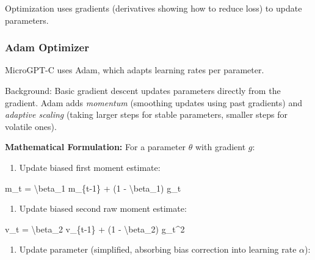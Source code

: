 \documentclass[
]{article}
\newenvironment{Shaded}{}{}
\newcommand{\NormalTok}[1]{#1}
\providecommand{\tightlist}{%
  \setlength{\itemsep}{0pt}\setlength{\parskip}{0pt}}
\begin{document}
Optimization uses gradients (derivatives showing how to reduce loss) to
update parameters.

\subsubsection{Adam Optimizer}\label{adam-optimizer}

MicroGPT-C uses Adam, which adapts learning rates per parameter.

Background: Basic gradient descent updates parameters directly from the
gradient. Adam adds \emph{momentum} (smoothing updates using past
gradients) and \emph{adaptive scaling} (taking larger steps for stable
parameters, smaller steps for volatile ones).

\textbf{Mathematical Formulation:} For a parameter \(\theta\) with
gradient \(g\):

\begin{enumerate}
\def\labelenumi{\arabic{enumi}.}
\tightlist
\item
  Update biased first moment estimate:
\end{enumerate}

\begin{Shaded}
\begin{Highlighting}[]
\NormalTok{   m\_t = \textbackslash{}beta\_1 m\_\{t{-}1\} + (1 {-} \textbackslash{}beta\_1) g\_t}
\end{Highlighting}
\end{Shaded}

\begin{enumerate}
\def\labelenumi{\arabic{enumi}.}
\setcounter{enumi}{1}
\tightlist
\item
  Update biased second raw moment estimate:
\end{enumerate}

\begin{Shaded}
\begin{Highlighting}[]
\NormalTok{   v\_t = \textbackslash{}beta\_2 v\_\{t{-}1\} + (1 {-} \textbackslash{}beta\_2) g\_t\^{}2}
\end{Highlighting}
\end{Shaded}

\begin{enumerate}
\def\labelenumi{\arabic{enumi}.}
\setcounter{enumi}{2}
\tightlist
\item
  Update parameter (simplified, absorbing bias correction into learning
  rate \(\alpha\)):
\end{enumerate}
\end{document}
